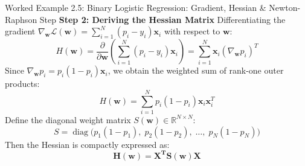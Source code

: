 \begin{examplebox}[breakable]{Worked Example 2.5: Binary Logistic Regression: Gradient, Hessian \& Newton-Raphson Step}
\textbf{Step 2: Deriving the Hessian Matrix}
Differentiating the gradient $\nabla_{\mathbf{w}} \mathcal{L}(\mathbf{w}) = \sum_{i=1}^N (p_i - y_i) \mathbf{x}_i$ with respect to $\mathbf{w}$:
\begin{equation*}
H(\mathbf{w}) = \frac{\partial}{\partial \mathbf{w}} \left( \sum_{i=1}^N (p_i - y_i) \mathbf{x}_i \right) = \sum_{i=1}^N \mathbf{x}_i \left( \nabla_{\mathbf{w}} p_i \right)^T
\end{equation*}
Since $\nabla_{\mathbf{w}} p_i = p_i(1 - p_i)\mathbf{x}_i$, we obtain the weighted sum of rank-one outer products:
\begin{equation*}
H(\mathbf{w}) = \sum_{i=1}^N p_i(1 - p_i) \mathbf{x}_i \mathbf{x}_i^T
\end{equation*}
Define the diagonal weight matrix $S(\mathbf{w}) \in \mathbb{R}^{N \times N}$:
\begin{equation*}
S = \operatorname{diag}\big( p_1(1 - p_1), \; p_2(1 - p_2), \; \dots, \; p_N(1 - p_N) \big)
\end{equation*}
Then the Hessian is compactly expressed as:
\begin{equation*}
\mathbf{H(\mathbf{w}) = X^T S(\mathbf{w}) X}
\end{equation*}


\end{examplebox}
